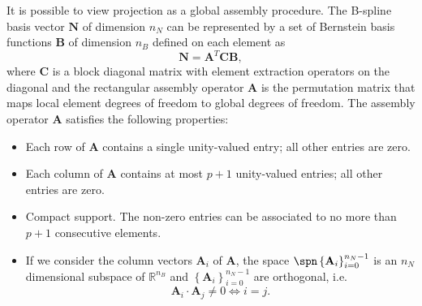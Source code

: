 It is possible to view \Bezier projection as a global assembly procedure. The B-spline basis vector $\mathbf{N}$ of dimension $n_N$ can be represented by a set of Bernstein basis functions $\mathbf{B}$ of dimension $n_B$ defined on each element as
\begin{equation}
	\mathbf{N} = \mathbf{A}^T\mathbf{C}\mathbf{B},
\end{equation}
where $\mathbf{C}$ is a block diagonal matrix with \Bezier element extraction operators on the diagonal and the rectangular assembly operator $\mathbf{A}$ is the permutation matrix that maps local element degrees of freedom to global degrees of freedom. The assembly operator $\mathbf{A}$ satisfies the following properties:
\begin{itemize}
	\item Each row of $\mathbf{A}$ contains a single unity-valued entry; all other entries are zero.
	\item Each column of $\mathbf{A}$ contains at most $p+1$ unity-valued entries; all other entries are zero.
	\item Compact support. The non-zero entries can be associated to no more than $p+1$ consecutive elements.
	\item If we consider the column vectors $\mathbf{A}_i$ of $\mathbf{A}$, the space $\spn\left\{\mathbf{A}_i\right\}_{i=0}^{n_N-1}$ is an $n_N$ dimensional subspace of $\mathbb{R}^{n_B}$ and $\left\{\mathbf{A}_i\right\}_{i=0}^{n_N-1}$ are orthogonal, i.e.
	      \begin{equation}
		      \mathbf{A}_i\cdot\mathbf{A}_j\neq{}0\iff{i=j}.
	      \end{equation}
\end{itemize}

